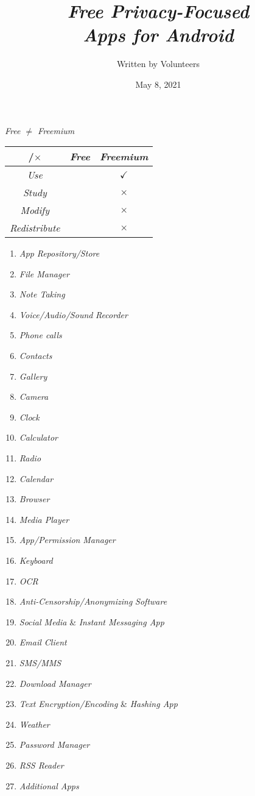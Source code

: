 \documentclass[12pt , a4paper]{article}
\title{\emph{Free Privacy-Focused}\\\emph{Apps for Android}}
\author{Written by Volunteers}
\date{May 8, 2021}
\begin{document}
\maketitle

\begin{center}
\space \Large{\emph{Free $\ne$ Freemium}}

\begin{table}[h]
	\centering
	\Huge
	\begin{tabular}{|c|c|c|}\hline
		\checkmark/$\times$& \LARGE{\emph{Free}} & \LARGE{\emph{Freemium}}\\ \hline
		\Large{\emph{Use}}& \checkmark & $\checkmark$\\ \hline
		\Large{\emph{Study}}& \checkmark & $\times$\\ \hline
		\Large{\emph{Modify}}& \checkmark & $\times$\\ \hline
		\Large{\emph{Redistribute}}& \checkmark & $\times$\\ \hline
	\end{tabular}
\end{table}
\end{center}

\newpage
\begin{enumerate}
	\LARGE
	\item \textit{App} \emph{Repository/Store}
	\item \emph{File Manager}
	\item \emph{Note Taking}
	\item \emph{Voice/Audio/Sound} \textit{Recorder}
	\item \emph{Phone calls}
	\item \emph{Contacts}
	\item \emph{Gallery}
	\item \emph{Camera}
	\item \emph{Clock}
	\item \emph{Calculator}
	\item \emph{Radio}
	\item \emph{Calendar}
	\item \emph{Browser}
	\item \emph{Media Player}
	\item \emph{App/Permission} \textit{Manager}
	\item \emph{Keyboard}
	\item \emph{OCR}
	\item \emph{Anti-Censorship/Anonymizing} \textit{Software}
	\item \emph{Social Media} \& \emph{Instant Messaging App}
	\item \emph{Email Client}
	\item \emph{SMS/MMS}
	\item \emph{Download Manager}
	\item \emph{Text Encryption/Encoding} \& \emph{Hashing App}
	\item \emph{Weather}
	\item \emph{Password Manager}
	\item \emph{RSS Reader}
	\item \emph{Additional Apps}
\end{enumerate}
\end{document}
